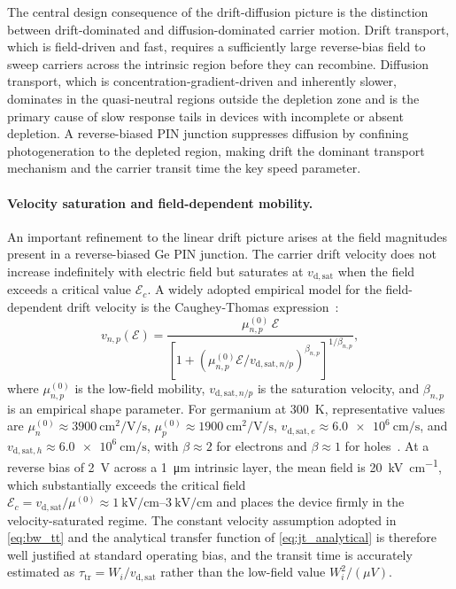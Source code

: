 The central design consequence of the drift-diffusion picture is the distinction
between drift-dominated and diffusion-dominated carrier motion.
Drift transport, which is field-driven and fast, requires a sufficiently large
reverse-bias field to sweep carriers across the intrinsic region before they
can recombine. Diffusion transport, which is concentration-gradient-driven and
inherently slower, dominates in the quasi-neutral regions outside the depletion
zone and is the primary cause of slow response tails in devices with incomplete
or absent depletion. A reverse-biased PIN junction suppresses diffusion by
confining photogeneration to the depleted region, making drift the dominant
transport mechanism and the carrier transit time the key speed parameter.

\paragraph{Velocity saturation and field-dependent mobility.}
An important refinement to the linear drift picture arises at the field
magnitudes present in a reverse-biased Ge PIN junction. The carrier drift
velocity does not increase indefinitely with electric field but saturates at
$v_{\mathrm{d,sat}}$ when the field exceeds a critical value
$\mathcal{E}_c$. A widely adopted empirical model for the field-dependent
drift velocity is the Caughey-Thomas expression~\cite{SzeNg2006}:
\begin{equation}
    v_{n,p}(\mathcal{E})
    = \frac{\mu_{n,p}^{(0)}\,\mathcal{E}}
           {\left[1 + \left(\mu_{n,p}^{(0)}\mathcal{E}/v_{\mathrm{d,sat},n/p}
           \right)^{\beta_{n,p}}\right]^{1/\beta_{n,p}}},
    \label{eq:caughey_thomas}
\end{equation}
where $\mu_{n,p}^{(0)}$ is the low-field mobility, $v_{\mathrm{d,sat},n/p}$
is the saturation velocity, and $\beta_{n,p}$ is an empirical shape parameter.
For germanium at \SI{300}{\kelvin}, representative values are
$\mu_n^{(0)} \approx \SI{3900}{\centi\metre\squared\per\volt\per\second}$,
$\mu_p^{(0)} \approx \SI{1900}{\centi\metre\squared\per\volt\per\second}$,
$v_{\mathrm{d,sat},e} \approx \SI{6.0e6}{\centi\metre\per\second}$, and
$v_{\mathrm{d,sat},h} \approx \SI{6.0e6}{\centi\metre\per\second}$, with
$\beta\approx 2$ for electrons and $\beta\approx 1$ for holes~\cite{SzeNg2006}.
At a reverse bias of \SI{2}{\volt} across a \SI{1}{\micro\metre} intrinsic
layer, the mean field is \SI{20}{\kilo\volt\per\centi\metre}, which
substantially exceeds the critical field
$\mathcal{E}_c = v_{\mathrm{d,sat}}/\mu^{(0)}
\approx \SIrange{1}{3}{\kilo\volt\per\centi\metre}$ and places the device
firmly in the velocity-saturated regime. The constant velocity assumption
adopted in \cref{eq:bw_tt} and the analytical transfer function of
\cref{eq:jt_analytical} is therefore well justified at standard operating
bias, and the transit time is accurately estimated as
$\tau_{\mathrm{tr}} = W_i/v_{\mathrm{d,sat}}$ rather than the low-field
value $W_i^2/(\mu V)$.

